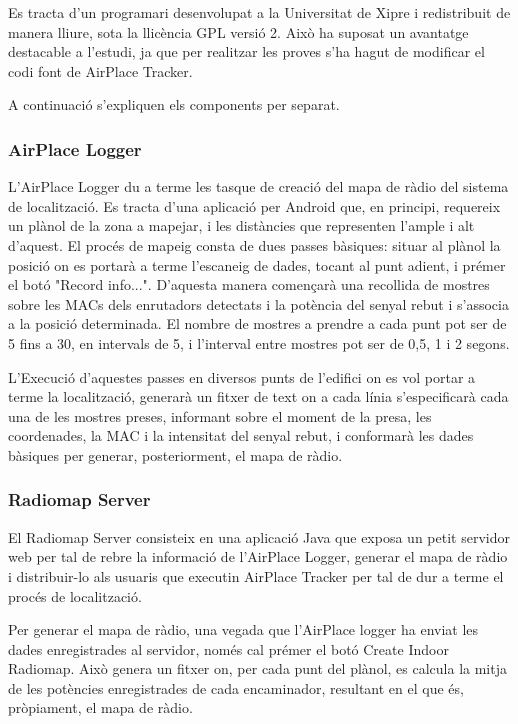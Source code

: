 Es tracta d'un programari desenvolupat a la Universitat de Xipre i redistribuit de manera lliure, sota la llicència GPL versió 2. Això ha suposat un avantatge destacable a l'estudi, ja que per realitzar les proves s'ha hagut de modificar el codi font de AirPlace Tracker.

A continuació s'expliquen els components per separat.

\subsubsection{AirPlace Logger}

L'AirPlace Logger du a terme les tasque de creació del mapa de ràdio del sistema de localització. Es tracta d'una aplicació per Android que, en principi, requereix un plànol de la zona a mapejar, i les distàncies que representen l'ample i alt d'aquest. El procés de mapeig consta de dues passes bàsiques: situar al plànol la posició on es portarà a terme l'escaneig de dades, tocant al punt adient, i prémer el botó "Record info...". D'aquesta manera començarà una recollida de mostres sobre les MACs dels enrutadors detectats i la potència del senyal rebut i s'associa a la posició determinada. El nombre de mostres a prendre a cada punt pot ser de 5 fins a 30, en intervals de 5, i l'interval entre mostres pot ser de 0,5, 1 i 2 segons.

L'Execució d'aquestes passes en diversos punts de l'edifici on es vol portar a terme la localització, generarà un fitxer de text on a cada línia s'especificarà cada una de les mostres preses, informant sobre el moment de la presa, les coordenades, la MAC i la intensitat del senyal rebut, i conformarà les dades bàsiques per generar, posteriorment, el mapa de ràdio.

\subsubsection{Radiomap Server}

El Radiomap Server consisteix en una aplicació Java que exposa un petit servidor web per tal de rebre la informació de l'AirPlace Logger, generar el mapa de ràdio i distribuir-lo als usuaris que executin AirPlace Tracker per tal de dur a terme el procés de localització.

Per generar el mapa de ràdio, una vegada que l'AirPlace logger ha enviat les dades enregistrades al servidor, només cal prémer el botó Create Indoor Radiomap. Això genera un fitxer on, per cada punt del plànol, es calcula la mitja de les potències enregistrades de cada encaminador, resultant en el que és, pròpiament, el mapa de ràdio.

